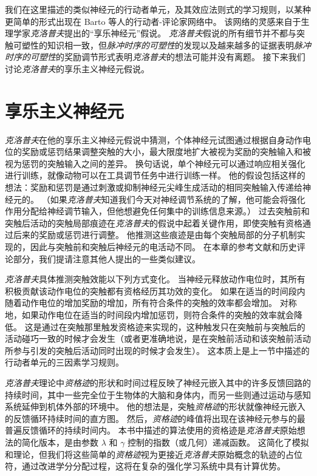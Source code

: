 我们在这里描述的类似神经元的行动者单元，及其效应法则式的学习规则，以某种更简单的形式出现在 Barto 等人的行动者-评论家网络中\cite{barto13neuron}。
该网络的灵感来自于生理学家\textit{克洛普夫}提出的“享乐神经元”假说\cite{klopf1972brain,klopf1982hedonistic}。
\textit{克洛普夫}假说的所有细节并不都与突触可塑性的知识相一致，但\textit{脉冲时序的可塑性}的发现以及越来越多的证据表明\textit{脉冲时序的可塑性}的奖励调节形式表明\textit{克洛普夫}的想法可能并没有离题。
接下来我们讨论\textit{克洛普夫}的享乐主义神经元假说。



\section{享乐主义神经元}


\textit{克洛普夫}\cite{klopf1972brain,klopf1982hedonistic}在他的享乐主义神经元假说中猜测，个体神经元试图通过根据自身动作电位的奖励或惩罚结果调整突触的大小，最大限度地扩大被视为奖励的突触输入和被视为惩罚的突触输入之间的差异。
换句话说，单个神经元可以通过响应相关强化进行训练，就像动物可以在工具调节任务中进行训练一样。
他的假设包括这样的想法：奖励和惩罚是通过刺激或抑制神经元尖峰生成活动的相同突触输入传递给神经元的。
（如果\textit{克洛普夫}知道我们今天对神经调节系统的了解，他可能会将强化作用分配给神经调节输入，但他想避免任何集中的训练信息来源。）
过去突触前和突触后活动的突触局部痕迹在\textit{克洛普夫}的假说中起着关键作用，即使突触有资格通过后来的奖励或惩罚进行调整。
他推测这些痕迹是由每个突触局部的分子机制实现的，因此与突触前和突触后神经元的电活动不同。
在本章的参考文献和历史评论部分，我们提请注意其他人提出的一些类似建议。


\textit{克洛普夫}具体推测突触效能以下列方式变化。
当神经元释放动作电位时，其所有积极贡献该动作电位的突触都有资格经历其功效的变化。
如果在适当的时间段内随着动作电位的增加奖励的增加，所有符合条件的突触的效率都会增加。
对称地，如果动作电位在适当的时间段内增加惩罚，则符合条件的突触的效率就会降低。
这是通过在突触那里触发资格迹来实现的，这种触发只在突触前与突触后的活动碰巧一致的时候才会发生（或者更准确地说，是在突触前活动和该突触前活动所参与引发的突触后活动同时出现的时候才会发生）。
这本质上是上一节中描述的行动者单元的三因素学习规则。


\textit{克洛普夫}理论中\textit{资格迹}的形状和时间过程反映了神经元嵌入其中的许多反馈回路的持续时间，其中一些完全位于生物体的大脑和身体内，而另一些则通过运动与感知系统延伸到机体外部的环境中。
他的想法是，突触\textit{资格迹}的形状就像神经元嵌入的反馈循环持续时间的直方图。
然后，\textit{资格迹}的峰值将出现在该神经元参与的最普遍反馈循环的持续时间内。
本书中描述的算法使用的资格迹是\textit{克洛普夫}原始想法的简化版本，是由参数 $\lambda$ 和 $\gamma$ 控制的指数（或几何）递减函数。
这简化了模拟和理论，但我们将这些简单的\textit{资格迹}视为更接近\textit{克洛普夫}原始概念的轨迹的占位符，通过改进学分分配过程，这将在复杂的强化学习系统中具有计算优势。


